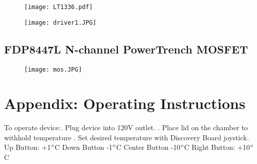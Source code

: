 \documentclass[11pt,letter]{article}
\begin{document}
\begin{figure}[H]
    \centering
    \texttt{[image: LT1336.pdf]}
\end{figure}

\begin{figure}[H]
    \centering
    \texttt{[image: driver1.JPG]}
\end{figure}

\newpage

%

\subsection{FDP8447L N-channel PowerTrench MOSFET}

\begin{figure}[H]
    \centering
    \texttt{[image: mos.JPG]}
\end{figure}


%

\section{Appendix: Operating Instructions}

To operate device:. Plug device into 120V outlet. . Place lid on the chamber to withhold temperature . Set desired temperature with Discovery Board joystick. \newline
Up Button: +1$\degree$C \newline
Down Button    -1$\degree$C\newline
Center Button  -10$\degree$C\newline
Right Button:	  +10$\degree$C
\end{document}
